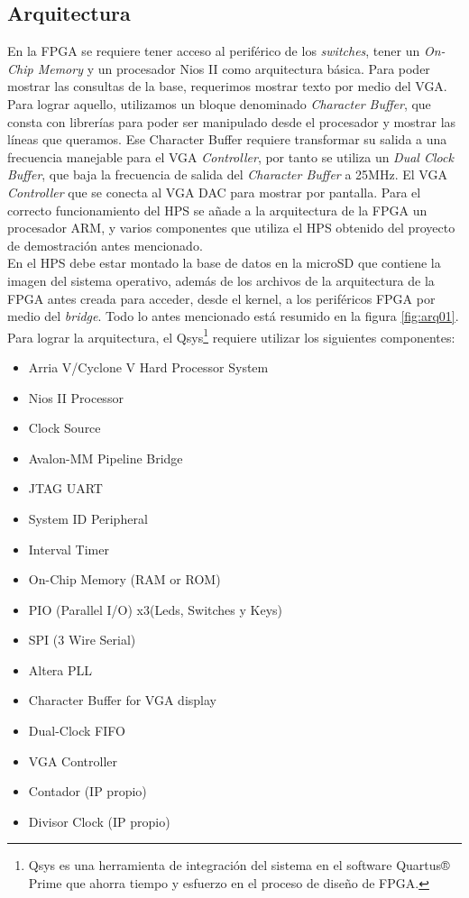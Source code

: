 \documentclass[conference]{IEEEtran}
\begin{document}
\subsection{Arquitectura}
En la FPGA se requiere tener acceso al periférico de los \textit{switches}, tener un \textit{On-Chip Memory} y un procesador Nios II como arquitectura básica. Para poder mostrar las consultas de la base, requerimos mostrar texto por medio del VGA. Para lograr aquello, utilizamos un bloque denominado \textit{Character Buffer}, que consta con librerías para poder ser manipulado desde el procesador y mostrar las líneas que queramos. Ese Character Buffer requiere transformar su salida a una frecuencia manejable para el VGA \textit{Controller}, por tanto se utiliza un \textit{Dual Clock Buffer}, que baja la frecuencia de salida del \textit{Character Buffer} a 25MHz. El VGA \textit{Controller} que se conecta al VGA DAC para mostrar por pantalla. Para el correcto funcionamiento del HPS se añade a la arquitectura de la FPGA un procesador ARM, y varios componentes que utiliza el HPS obtenido del proyecto de demostración antes mencionado.\\
En el HPS debe estar montado la base de datos en la microSD que contiene la imagen del sistema operativo, además de los archivos de la arquitectura de la FPGA antes creada para acceder, desde el kernel, a los periféricos FPGA por medio del \textit{bridge}. Todo lo antes mencionado está resumido en la figura \ref{fig:arq01}.\\
Para lograr la arquitectura, el Qsys\footnote{Qsys es una herramienta de integración del sistema en el software Quartus® Prime que ahorra tiempo y esfuerzo en el proceso de diseño de FPGA.} requiere utilizar los siguientes componentes:
\begin{itemize}
  \item Arria V/Cyclone V Hard Processor System
  \item Nios II Processor
  \item Clock Source
  \item Avalon-MM Pipeline Bridge
  \item JTAG UART
  \item System ID Peripheral
  \item Interval Timer
  \item On-Chip Memory (RAM or ROM)
  \item PIO (Parallel I/O) x3(Leds, Switches y Keys)
  \item SPI (3 Wire Serial)
  \item Altera PLL
  \item Character Buffer for VGA display
  \item Dual-Clock FIFO
  \item VGA Controller
  \item Contador (IP propio)
  \item Divisor Clock (IP propio)
\end{itemize}
\end{document}
